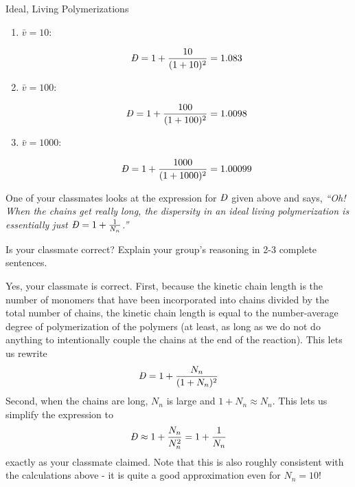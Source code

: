 \begin{activity}{Ideal, Living Polymerizations}
\begin{ctqs}
\begin{enumerate}
			\item $\bar v = 10$:
			
				\begin{solution}[0.25in]{}
					\begin{equation*}
						\PDImath = 1+\frac{10}{(1+10)^2} = 1.083
					\end{equation*}
				\end{solution}
			
			\item $\bar v = 100$:
			
				\begin{solution}[0.25in]{}
					\begin{equation*}
						\PDImath = 1+\frac{100}{(1+100)^2} = 1.0098
					\end{equation*}
				\end{solution}
			
			\item $\bar v = 1000$:
			
				\begin{solution}[0.25in]{}
					\begin{equation*}
						\PDImath = 1+\frac{1000}{(1+1000)^2} = 1.00099
					\end{equation*}
				\end{solution}
			
		\end{enumerate}
		
	\question One of your classmates looks at the expression for $\PDImath$ given above and says, \emph{``Oh!  When the chains get really long, the dispersity in an ideal living polymerization is essentially just $\PDImath = 1+\frac{1}{N_n}$.''}
	
		Is your classmate correct?  Explain your group's reasoning in 2-3 complete sentences.
		
		\begin{solution}[2in]{}
			Yes, your classmate is correct.  First, because the kinetic chain length is the number of monomers that have been incorporated into chains divided by the total number of chains, the kinetic chain length is equal to the number-average degree of polymerization of the polymers (at least, as long as we do not do anything to intentionally couple the chains at the end of the reaction).  This lets us rewrite
	\begin{equation*}
		\PDImath = 1+\frac{N_n}{(1+N_n)^2}
	\end{equation*}
			Second, when the chains are long, $N_n$ is large and $1+N_n \approx N_n$.  This lets us simplify the expression to 
	\begin{equation*}
		\PDImath \approx 1+\frac{N_n}{N_n^2} = 1+\frac{1}{N_n}
	\end{equation*}
	exactly as your classmate claimed. Note that this is also roughly consistent with the calculations above - it is quite a good approximation even for $N_n=10$!
		\end{solution}
		

\end{ctqs}
\end{activity}
